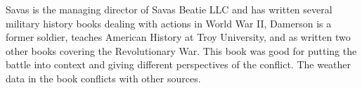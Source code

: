 Savas is the managing director of Savas Beatie LLC and has written several
military history books dealing with actions in World War II, Damerson is a
former soldier, teaches American History at Troy University, and as written two
other books covering the Revolutionary War.  This book was good for putting the
battle into context and giving different perspectives of the conflict.  The
weather data in the book conflicts with other sources.
